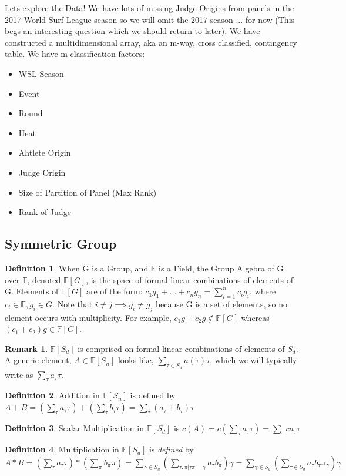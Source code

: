 \documentclass{article}
\theoremstyle{definition}
\newtheorem{definition}{Definition}
\newtheorem*{remark}{Remark}
\begin{document}
Lets explore the Data!
We have lots of missing Judge Origins from panels in the 2017 World Surf League season so we will omit the 2017 season ... for now (This begs an interesting question which we should return to later). We have constructed a multidimensional array, aka an m-way, cross classified, contingency table. We have m classification factors:
\begin{itemize}
\item WSL Season
\item Event
\item Round
\item Heat
\item Ahtlete Origin
\item Judge Origin
\item Size of Partition of Panel (Max Rank)
\item Rank of Judge
\end{itemize}


\subsection{Symmetric Group}
\begin{definition}When G is a Group, and $\mathbb{F}$ is a Field, the Group Algebra of G over $\mathbb{F}$, denoted $\mathbb{F}[G]$, is the space of formal linear combinations of elements of G. Elements of $\mathbb{F}[G]$ are of the form: $c_1 g_1 + \dots + c_n g_n = \sum^n_{i=1} c_i g_i$, where $c_i \in \mathbb{F}, g_i \in G$. Note that $i\neq j \implies g_i \neq g_j$ because G is a set of elements, so no element occurs with multiplicity. For example, $c_1 g + c_2 g \not\in \mathbb{F}[G]$ whereas $(c_1 + c_2)g \in \mathbb{F}[G]. $\end{definition}

\begin{remark} $\mathbb{F}[S_d]$ is comprised on formal linear combinations of elements of $S_d$. A generic element, $A \in \mathbb{F}[S_n]$ looks like, $\sum_{\tau \in S_d} a(\tau)\tau$, which we will typically write as $\sum_\tau a_\tau \tau$. \end{remark}
\begin{definition}Addition in $\mathbb{F}[S_n]$ is defined by $A+B = (\sum_{\tau}a_{\tau}\tau) + (\sum_{\tau}b_{\tau}\tau) = \sum_{\tau} (a_{\tau}+b_{\tau})\tau $ \end{definition}
\begin{definition}Scalar Multiplication in $\mathbb{F}[S_d]$ is $c(A) = c(\sum_{\tau} a_\tau \tau)  = \sum_{\tau} ca_\tau \tau$\end{definition}
\begin{definition} Multiplication in $\mathbb{F}[S_d]$ is \textit{defined} by
$ A*B 
=(\sum_{\tau} a_\tau \tau)* (\sum_\pi b_\pi \pi)
=\sum_{\gamma \in S_d}(\sum_{  \tau,\pi | \tau\pi = \gamma  } a_\tau b_\pi) \gamma
= \sum_{\gamma \in S_d}(\sum_{  \tau \in S_d} a_\tau b_{\tau^{-1}\gamma} ) \gamma$ \end{definition}
\end{document}
